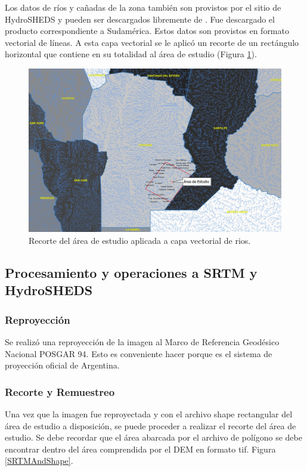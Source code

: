 \documentclass[10pt,a4paper, twoside]{report}
\begin{document}
Los datos de ríos y cañadas de la zona también son provistos por el sitio de HydroSHEDS y pueden ser descargados libremente de \cite{hydroShedsSite}. Fue descargado el producto correspondiente a Sudamérica. Estos datos son provistos en formato vectorial de líneas. A esta capa vectorial se le aplicó un recorte de un rectángulo horizontal que contiene en su totalidad al área de estudio (Figura \ref{areaestudiorios}).


\begin{figure}[!htb]
   \centering      
   \includegraphics[width=1.0\textwidth]{imagenes/areaestudiorios.jpg}
 \caption{Recorte del área de estudio aplicada a capa vectorial de rios.}
 \label{areaestudiorios}
\end{figure}

\subsection{Procesamiento y operaciones a SRTM y HydroSHEDS}


\subsubsection{Reproyección}

Se realizó una reproyección de la imagen al Marco de Referencia Geodésico Nacional POSGAR 94. Esto es conveniente hacer porque es el sistema de proyección oficial de Argentina.

\subsubsection{Recorte y Remuestreo}

Una vez que la imagen fue reproyectada y con el archivo shape rectangular del área de estudio a disposición, se puede proceder a realizar el recorte del área de estudio. Se debe recordar que el área abarcada por el archivo de polígono se debe encontrar dentro del área comprendida por el DEM en formato tif. Figura \ref{SRTMAndShape}.
\end{document}
